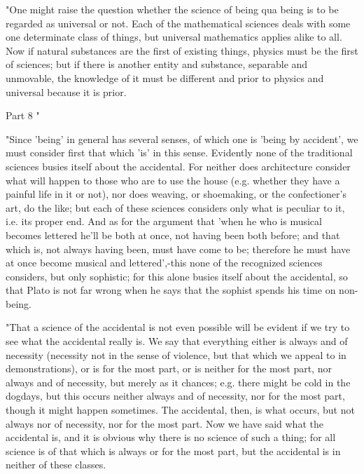 "One might raise the question whether the science of being qua being
is to be regarded as universal or not. Each of the mathematical sciences
deals with some one determinate class of things, but universal mathematics
applies alike to all. Now if natural substances are the first of existing
things, physics must be the first of sciences; but if there is another
entity and substance, separable and unmovable, the knowledge of it
must be different and prior to physics and universal because it is
prior. 

Part 8 "

"Since 'being' in general has several senses, of which one is 'being
by accident', we must consider first that which 'is' in this sense.
Evidently none of the traditional sciences busies itself about the
accidental. For neither does architecture consider what will happen
to those who are to use the house (e.g. whether they have a painful
life in it or not), nor does weaving, or shoemaking, or the confectioner's
art, do the like; but each of these sciences considers only what is
peculiar to it, i.e. its proper end. And as for the argument that
'when he who is musical becomes lettered he'll be both at once, not
having been both before; and that which is, not always having been,
must have come to be; therefore he must have at once become musical
and lettered',-this none of the recognized sciences considers, but
only sophistic; for this alone busies itself about the accidental,
so that Plato is not far wrong when he says that the sophist spends
his time on non-being. 

"That a science of the accidental is not even possible will be evident
if we try to see what the accidental really is. We say that everything
either is always and of necessity (necessity not in the sense of violence,
but that which we appeal to in demonstrations), or is for the most
part, or is neither for the most part, nor always and of necessity,
but merely as it chances; e.g. there might be cold in the dogdays,
but this occurs neither always and of necessity, nor for the most
part, though it might happen sometimes. The accidental, then, is what
occurs, but not always nor of necessity, nor for the most part. Now
we have said what the accidental is, and it is obvious why there is
no science of such a thing; for all science is of that which is always
or for the most part, but the accidental is in neither of these classes.

